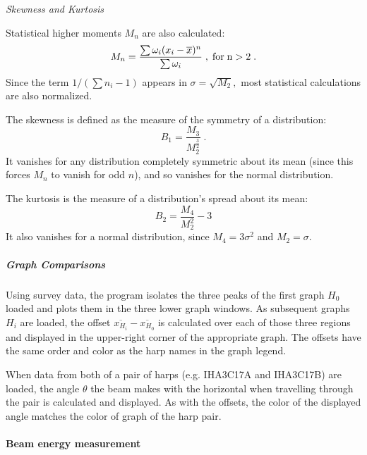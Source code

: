 {	{\sl Skewness and Kurtosis}

Statistical higher moments $M_n$ are also calculated:
\begin{equation}
M_n = \frac{\sum \omega_i (x_i-\overline{x})^n}{\sum \omega_i} \; , \; {\rm for \; n>2} \; .
\end{equation}
Since the term $1/(\sum n_i-1)$ appears in $\sigma=\sqrt{M_2},$ most statistical calculations
are also normalized.  

The skewness is defined as the measure of the symmetry of a distribution:
\begin{equation}
B_1=\frac{M_3}{M_2^\frac{3}{2}} \; .
\end{equation}
It vanishes for any distribution completely symmetric about its mean (since this forces $M_n$ to 
vanish for odd $n$), and so vanishes for the normal distribution.

The kurtosis is the measure of a distribution's spread about its mean:
\begin{equation}
B_2=\frac{M_4}{M_2^2}-3
\end{equation}
It also vanishes for a normal distribution, since $M_4=3\sigma^2$ and $M_2=\sigma.$

	\subparagraph{Graph Comparisons}

Using survey data, the program isolates the three peaks of the first graph $H_0$ loaded and plots them in the
three lower graph windows.  As subsequent graphs $H_i$ are loaded, the offset
$\overline{x_{H_i}}-\overline{x_{H_0}}$ is calculated over each of those three regions and displayed in the 
upper-right corner of the appropriate graph.  The offsets have the same order and color as the harp names in
the graph legend.
 
When data from both of a pair of harps (e.g. IHA3C17A and IHA3C17B) are loaded, the angle $\theta$ the
beam makes with the horizontal when travelling through the pair is calculated and displayed.  As with the
offsets, the color of the displayed angle matches the color of graph of the harp pair.

\paragraph{Beam energy measurement}\label{energy}

}
